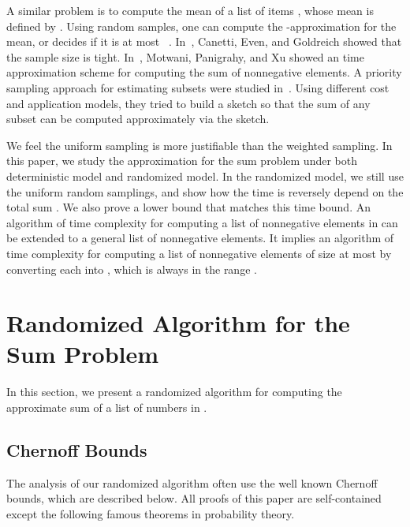 \documentclass[runningheads]{llncs}
\begin{document}
A similar problem is to compute the mean of a list of items
, whose mean is defined by
. Using  random samples, one can compute the
-approximation for the mean, or decides if it is at
most ~\cite{Hoefding63}. In~\cite{CanettiEvenGoldreich95},
Canetti, Even, and Goldreich showed that the sample size is tight.
In~\cite{MotwaniPanigrahyXu07}, Motwani, Panigrahy, and Xu showed an
 time approximation scheme for computing the sum of 
nonnegative elements.  A priority sampling approach for estimating
subsets were studied
in~\cite{AlonDuffieldLundThorup05,DuffieldLundThorup05,BroderFonturaJosifovskiKumarMotwaniNabarPanigrahyTomkinsXu06}.
Using  different cost and application models,  they tried to build a
sketch so that the sum of any subset can be computed approximately
via the sketch.

We feel the uniform sampling is more justifiable than the weighted
sampling. In this paper, we study the approximation for the sum
problem under both deterministic model and randomized model.  In the
randomized model, we still use the uniform random samplings, and
show how the time is reversely depend on the total sum . We also prove a lower bound that matches this time bound. An
algorithm of time complexity  for computing a list
of nonnegative elements  in  can be extended
to a general list of nonnegative elements. It implies an algorithm
of time complexity  for computing
a list of nonnegative elements of size at most  by converting
each  into , which is always in the range
.













\section{Randomized Algorithm for the Sum Problem}

In this section, we present a randomized algorithm for computing the
approximate sum of a list of numbers in .

\subsection{Chernoff Bounds}\label{chernoff-sec}
 The analysis of our randomized
algorithm often use  the well known Chernoff bounds, which are
described below. All proofs of this paper are self-contained except
the following famous theorems in probability theory.
\end{document}
